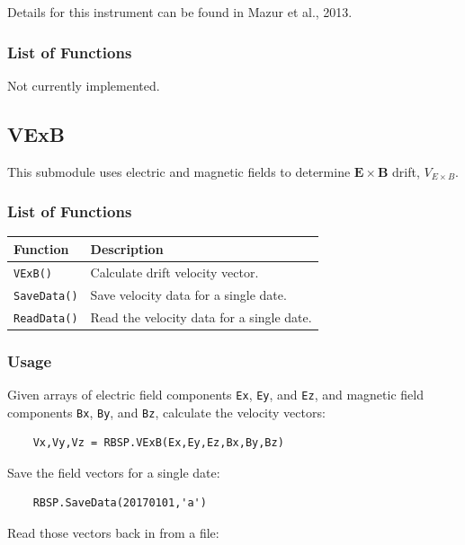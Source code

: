 	Details for this instrument can be found in Mazur et al., 2013.
	
	\subsubsection{List of Functions}
	
	Not currently implemented.
	
	\subsection{VExB}
	
	This submodule uses electric and magnetic fields to determine $\mathbf{E} \times \mathbf{B}$ drift, $V_{E\times B}$.
	
	\subsubsection{List of Functions}
	
	\begin{tabular}{|l|l|}
	\hline
	Function & Description \\
	\hline
	\texttt{VExB()} & Calculate drift velocity vector. \\
	\texttt{SaveData()} & Save velocity data for a single date. \\
	\texttt{ReadData()} & Read the velocity data for a single date. \\
	\hline
	\end{tabular}
	
	\subsubsection{Usage}
	
	Given arrays of electric field components \texttt{Ex}, \texttt{Ey}, and \texttt{Ez}, and magnetic field components \texttt{Bx}, \texttt{By}, and \texttt{Bz}, calculate the velocity vectors:
	
	\begin{verbatim}
	Vx,Vy,Vz = RBSP.VExB(Ex,Ey,Ez,Bx,By,Bz)
	\end{verbatim}
	
	Save the field vectors for a single date:
	
	\begin{verbatim}
	RBSP.SaveData(20170101,'a')
	\end{verbatim}
	
	Read those vectors back in from a file:
	

